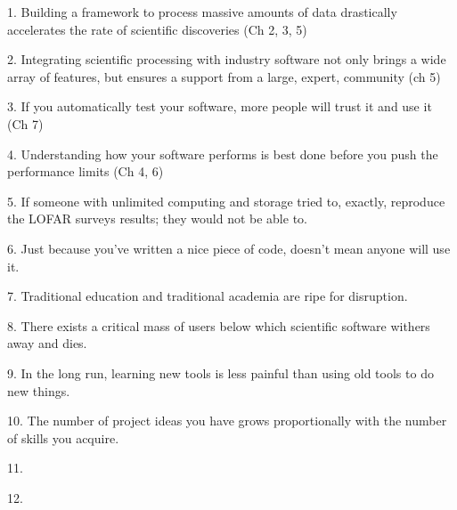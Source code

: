 1. Building a framework to process massive amounts of data drastically accelerates the rate of scientific discoveries (Ch 2, 3, 5)

2. Integrating scientific processing with industry software not only brings a wide array of features, but ensures a support from a large, expert, community (ch 5)

3. If you automatically test your software, more people will trust it and use it (Ch 7)

4. Understanding how your software performs is best done before you push the performance limits (Ch 4, 6) 

5. If someone with unlimited computing and storage tried to, exactly, reproduce the LOFAR surveys results; they would not be able to.

6. Just because you've written a nice piece of code, doesn't mean anyone will use it.  

7. Traditional education and traditional academia are ripe for disruption. 

8. There exists a critical mass of users below which scientific software withers away and dies.

9. In the long run, learning new tools is less painful than using old tools to do new things. 

10. The number of project ideas you have grows proportionally with the number of skills you acquire.

11.  

12. 
